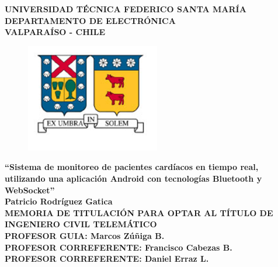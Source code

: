 \documentclass[12pt,spanish]{thesis}
\begin{document}
\thispagestyle{empty}

\begin{center}
\renewcommand{\baselinestretch}{1.15}
\textbf{\large{UNIVERSIDAD TÉCNICA FEDERICO SANTA MARÍA\\}
\normalsize{DEPARTAMENTO DE ELECTRÓNICA\\VALPARAÍSO - CHILE\\}}

\vspace{0.5cm}
\begin{figure}[H]
\centering
  \includegraphics[width=5.85cm]{figuras/usmLogo.png}
\end{figure}
\vspace{0.5cm}

\renewcommand{\baselinestretch}{1}
\hangindent=0cm
\textbf{\Large ``Sistema de monitoreo de pacientes cardíacos en tiempo real, utilizando una aplicación Android con tecnologías Bluetooth y WebSocket''\\}
\vspace{3cm}
\hangindent=0cm\large \textbf{Patricio Rodríguez Gatica}\\
\vspace{0.5cm}
\hangindent=0cm\normalsize \textbf{MEMORIA DE TITULACIÓN PARA OPTAR AL TÍTULO DE INGENIERO CIVIL TELEMÁTICO}\\
\vspace{1cm}
\hangindent=0cm\normalsize \textbf{PROFESOR GUIA: \hspace{2cm} Marcos Zúñiga B.}\\
\vspace{0.5cm}
\hangindent=0cm\normalsize \textbf{PROFESOR CORREFERENTE: \hspace{2cm} Francisco Cabezas B.}\\
\vspace{0.5cm}
\hangindent=0cm\normalsize \textbf{PROFESOR CORREFERENTE: \hspace{2cm} Daniel Erraz L.}\\

\end{center}
\end{document}
